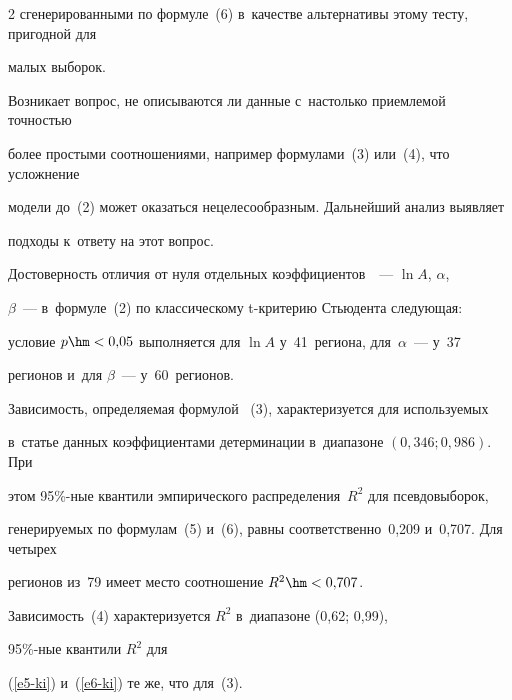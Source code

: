 \begin{multicols}{2}
сгенерированными по формуле~(6) в~качестве альтернативы этому тесту, пригодной для 


малых выборок. 


  


  Возникает вопрос, не описываются ли данные с~настолько приемлемой точ\-ностью 


более прос\-ты\-ми соотношениями, например формулами~(3) или~(4), что усложнение 


модели до~(2) может оказаться нецелесообразным. Дальнейший анализ выявляет 


подходы к~ответу на этот вопрос.


   


  Достоверность отличия от нуля отдельных коэффициентов~~--- $\ln A$, $\alpha$, 


$\beta$~--- в~формуле~(2) по классическому t-кри\-те\-рию Стьюдента следующая: 


условие $p\hm < 0{,}05$ выполняется для $\ln A$ у~41~региона, для~$\alpha$~--- у~37 


регионов и~для $\beta$~--- у~60~регионов.


{





}


  


  Зависимость, определяемая формулой~ (3), характеризуется для используемых 


в~статье данных коэффициентами детерминации в~диапазоне $(0{,}346; 0{,}986)$. При 


этом 95\%-ные квантили эмпирического распределения~$R^2$ для псевдовыборок, 


генерируемых по формулам~(5) и~(6), равны соответственно~0,209 и~0,707. Для четырех 


регионов из~79 имеет место соотношение $R^2\hm< 0{,}707$.


{





}


  


  Зависимость~(4) характеризуется $R^2$ в~диапазоне (0,62; 0,99), 


  95\%-ные квантили $R^2$ для 


(\ref{e5-ki}) и~(\ref{e6-ki}) те же, что для~(3). 



\end{multicols}
